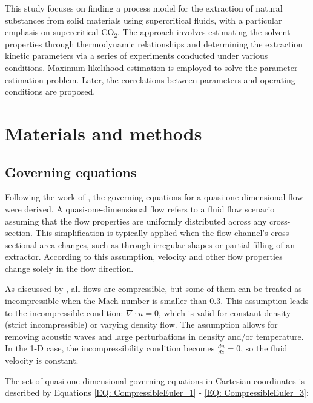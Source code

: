 \documentclass[a4paper,fleqn]{cas-dc}
\begin{document}
This study focuses on finding a process model for the extraction of natural substances from solid materials using supercritical fluids, with a particular emphasis on supercritical CO$_2$. The approach involves estimating the solvent properties through thermodynamic relationships and determining the extraction kinetic parameters via a series of experiments conducted under various conditions. Maximum likelihood estimation is employed to solve the parameter estimation problem. Later, the correlations between parameters and operating conditions are proposed.


\section{Materials and methods} \label{CH: Materials and methods}

\subsection{Governing equations} \label{CH:Governing_equations_chapter}
Following the work of \citet{Anderson1995}, the governing equations for a quasi-one-dimensional flow were derived. A quasi-one-dimensional flow refers to a fluid flow scenario assuming that the flow properties are uniformly distributed across any cross-section. This simplification is typically applied when the flow channel's cross-sectional area changes, such as through irregular shapes or partial filling of an extractor. According to this assumption, velocity and other flow properties change solely in the flow direction.

As discussed by \citet{Anderson2023}, all flows are compressible, but some of them can be treated as incompressible when the Mach number is smaller than 0.3. This assumption leads to the incompressible condition: $\nabla \cdot u =0$, which is valid for constant density (strict incompressible) or varying density flow. The assumption allows for removing acoustic waves and large perturbations in density and/or temperature. In the 1-D case, the incompressibility condition becomes $\frac{du}{dz} = 0$, so the fluid velocity is constant.

The set of quasi-one-dimensional governing equations in Cartesian coordinates is described by Equations \ref{EQ: CompressibleEuler_1} - \ref{EQ: CompressibleEuler_3}:
\end{document}
